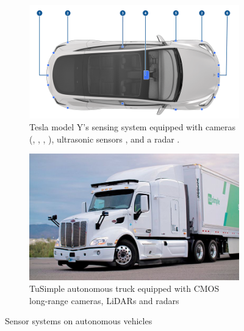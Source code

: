 \begin{figure}[ht]
    \begin{subfigure}[b]{0.49\textwidth} 
        \includegraphics[width=\textwidth]{figures/tesla.png} 
        \caption{
        Tesla model Y's sensing system
        equipped with cameras (, 
        , 
        , ),
        ultrasonic sensors , and a radar .
        }
        \label{fig:intro-tesla} 
    \end{subfigure} \hfill
    \begin{subfigure}[b]{0.4\textwidth} 
        \includegraphics[width=\textwidth]{figures/tusimple.jpg} 
        \caption{TuSimple autonomous truck equipped with CMOS long-range cameras, 
        LiDARs and radars} 
        \label{fig:intro-truckcam} 
    \end{subfigure} 
    \caption{Sensor systems on autonomous vehicles}
    \label{fig:intro-autonomous-vehicles}
\end{figure} 

